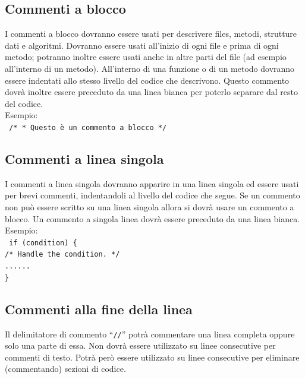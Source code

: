 \documentclass[11pt,titlepage,a4paper]{report}
\begin{document}
\subsection{Commenti a blocco}
I commenti a blocco dovranno essere usati per descrivere files, metodi, strutture dati e algoritmi. Dovranno essere usati all'inizio di ogni file e prima
di ogni metodo; potranno inoltre essere usati anche in altre parti del file (ad esempio all'interno di un metodo). All'interno di una funzione o di un metodo dovranno essere indentati allo stesso livello del codice che descrivono. Questo commento dovr\`a inoltre essere preceduto da una linea bianca per poterlo separare dal resto del codice. \\
 \newline
Esempio: \\
\texttt{
	/* \newline
	* Questo è un commento a blocco \newline
	*/
} \\
 \newline
\subsection{Commenti a linea singola}
I commenti a linea singola dovranno apparire in una linea singola ed essere usati per brevi commenti, indentandoli al livello del codice che segue. Se un commento non pu\`o essere scritto su una linea singola allora si dovr\`a usare un commento a blocco. Un commento a singola linea dovr\`a essere preceduto da una linea bianca. \\
 \newline
Esempio: \\
\texttt{
	if (condition) \{ \\
	\phantom{....}/* Handle the condition. */ \\
	\phantom{....}...... \\
	\}
} \\
 \newline
\subsection{Commenti alla fine della linea}
Il delimitatore di commento ``\texttt{//}'' potr\`a commentare una linea completa oppure solo una parte di essa. Non dovr\`a essere utilizzato su linee consecutive per commenti di testo. Potr\`a per\`o essere utilizzato su linee consecutive per eliminare (commentando) sezioni di codice.
\end{document}
